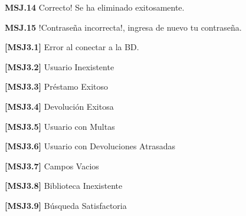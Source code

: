 	\begin{Citemize}
	\item {\bf MSJ.14} Correcto! Se ha eliminado exitosamente.
	\end{Citemize}
	
	\begin{Citemize}
	\item {\bf MSJ.15} !Contraseña incorrecta!, ingresa de nuevo tu contraseña.
	\end{Citemize}

	\begin{Citemize}
	\item {\bf [MSJ3.1]} Error al conectar a la BD.
	\end{Citemize}

	\begin{Citemize}
	\item {\bf [MSJ3.2]} Usuario Inexistente
	\end{Citemize}
	
	\begin{Citemize}
	\item {\bf [MSJ3.3]} Préstamo Exitoso
	\end{Citemize}
	
	\begin{Citemize}
	\item {\bf [MSJ3.4]} Devolución Exitosa
	\end{Citemize}
	
	\begin{Citemize}
	\item {\bf [MSJ3.5]} Usuario con Multas
	\end{Citemize}
	
	\begin{Citemize}
	\item {\bf [MSJ3.6]} Usuario con Devoluciones Atrasadas
	\end{Citemize}
	
	\begin{Citemize}
	\item {\bf [MSJ3.7]} Campos Vacios
	\end{Citemize}
	
	\begin{Citemize}
	\item {\bf [MSJ3.8]} Biblioteca Inexistente
	\end{Citemize}
	
	\begin{Citemize}
	\item {\bf [MSJ3.9]} Búsqueda Satisfactoria
	\end{Citemize}
	
